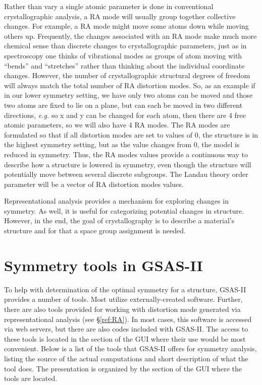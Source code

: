 Rather than vary a single atomic parameter is done in conventional crystallographic analysis, a RA mode will usually group together collective changes. For example, a RA mode might move some atoms down while moving others up. Frequently, the changes associated with an RA mode make much more chemical sense than discrete changes to crystallographic parameters, just as in spectroscopy one thinks of vibrational modes as groups of atom moving with ``bends'' and ``stretches'' rather than thinking about the individual coordinate changes. However, the number of crystallographic structural degrees of freedom will always match the total number of RA distortion modes. So, as an example if in our lower symmetry setting, we have only two atoms can be moved and those two atoms are fixed to lie on a plane, but can each be moved in two different directions, \textit{e.g.} so x and y can be changed for each atom, then there are 4 free atomic parameters, so we will also have 4 RA modes. The RA modes are formulated so that if all distortion modes are set to values of 0, the structure is in the highest symmetry setting, but as the value changes from 0, the model is reduced in symmetry. Thus, the RA modes values provide a continuous way to describe how a structure is lowered in symmetry, even though the structure will potentially move between several discrete subgroups. The Landau theory order parameter will be a vector of RA distortion modes values. 

Representational analysis provides a mechanism for exploring changes in symmetry. As well, it is useful for  categorizing potential changes in structure. However, in the end, the goal of crystallography is to describe a material's structure and for that a space group assignment is needed. 

\section{Symmetry tools in GSAS-II}

To help with determination of the optimal symmetry for a structure, GSAS-II provides a number of tools. 
Most utilize externally-created software. 
Further, there are also tools provided for working with distortion mode generated via representational analysis (see \S\ref{ref:RA}). 
In most cases, this software is accessed via web servers, but there are also codes included with GSAS-II. 
The access to these tools is located in the section of the GUI where their use would be most convenient. 
Below is a list of the tools that GSAS-II offers for symmetry analysis, listing the 
source of the actual computations and short description of what the tool does. The presentation is organized by the section of the GUI where the tools are located.

